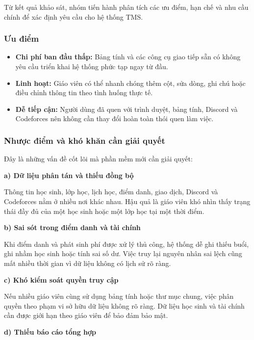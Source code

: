 \documentclass[12pt,a4paper]{article}
\begin{document}
Từ kết quả khảo sát, nhóm tiến hành phân tích các ưu điểm, hạn chế và nhu cầu
chính để xác định yêu cầu cho hệ thống TMS.

\subsubsection{Ưu điểm}

\begin{itemize}[leftmargin=*]
    \item \textbf{Chi phí ban đầu thấp:} Bảng tính và các công cụ giao tiếp sẵn
    có không yêu cầu triển khai hệ thống phức tạp ngay từ đầu.

    \item \textbf{Linh hoạt:} Giáo viên có thể nhanh chóng thêm cột, sửa dòng,
    ghi chú hoặc điều chỉnh thông tin theo tình huống thực tế.

    \item \textbf{Dễ tiếp cận:} Người dùng đã quen với trình duyệt, bảng tính,
    Discord và Codeforces nên không cần thay đổi hoàn toàn thói quen làm việc.
\end{itemize}

\subsubsection{Nhược điểm và khó khăn cần giải quyết}

Đây là những vấn đề cốt lõi mà phần mềm mới cần giải quyết:

\textbf{a) Dữ liệu phân tán và thiếu đồng bộ}

Thông tin học sinh, lớp học, lịch học, điểm danh, giao dịch, Discord và
Codeforces nằm ở nhiều nơi khác nhau. Hậu quả là giáo viên khó nhìn thấy trạng
thái đầy đủ của một học sinh hoặc một lớp học tại một thời điểm.

\textbf{b) Sai sót trong điểm danh và tài chính}

Khi điểm danh và phát sinh phí được xử lý thủ công, hệ thống dễ ghi thiếu buổi,
ghi nhầm học sinh hoặc tính sai số dư. Việc truy lại nguyên nhân sai lệch cũng
mất nhiều thời gian vì dữ liệu không có lịch sử rõ ràng.

\textbf{c) Khó kiểm soát quyền truy cập}

Nếu nhiều giáo viên cùng sử dụng bảng tính hoặc thư mục chung, việc phân quyền
theo phạm vi sở hữu dữ liệu không rõ ràng. Dữ liệu học sinh và tài chính cần
được giới hạn theo giáo viên để bảo đảm bảo mật.

\textbf{d) Thiếu báo cáo tổng hợp}
\end{document}
